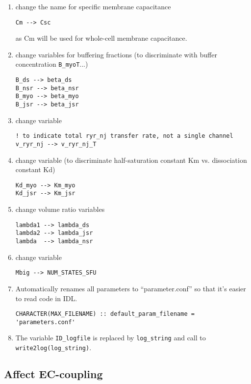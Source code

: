 \begin{enumerate}
\item change the name for specific membrane capacitance
\begin{verbatim}
Cm --> Csc
\end{verbatim}
as Cm will be used for whole-cell membrane capacitance.

\item change variables for buffering fractions (to discriminate with buffer
  concentration \verb!B_myoT!...)
\begin{verbatim}
B_ds --> beta_ds  
B_nsr --> beta_nsr
B_myo --> beta_myo
B_jsr --> beta_jsr
\end{verbatim}



\item change variable
\begin{verbatim}
! to indicate total ryr_nj transfer rate, not a single channel
v_ryr_nj --> v_ryr_nj_T
\end{verbatim}


\item change variable (to discriminate half-saturation constant Km vs. dissociation
  constant Kd)
\begin{verbatim}
Kd_myo --> Km_myo
Kd_jsr --> Km_jsr
\end{verbatim}

\item change volume ratio variables
\begin{verbatim}
lambda1 --> lambda_ds
lambda2 --> lambda_jsr
lambda  --> lambda_nsr
\end{verbatim}

\item change variable
\begin{verbatim}
Mbig --> NUM_STATES_SFU
\end{verbatim}

\item Automatically renames all parameters to ``parameter.conf'' so that it's
easier to read code in IDL.
\begin{verbatim}
CHARACTER(MAX_FILENAME) :: default_param_filename = 'parameters.conf'
\end{verbatim}

\item The variable \verb!ID_logfile! is replaced by \verb!log_string! and call
to \verb!write2log(log_string)!. 
\end{enumerate}

\subsection{Affect EC-coupling}
\label{sec:ec-coupling-1}

